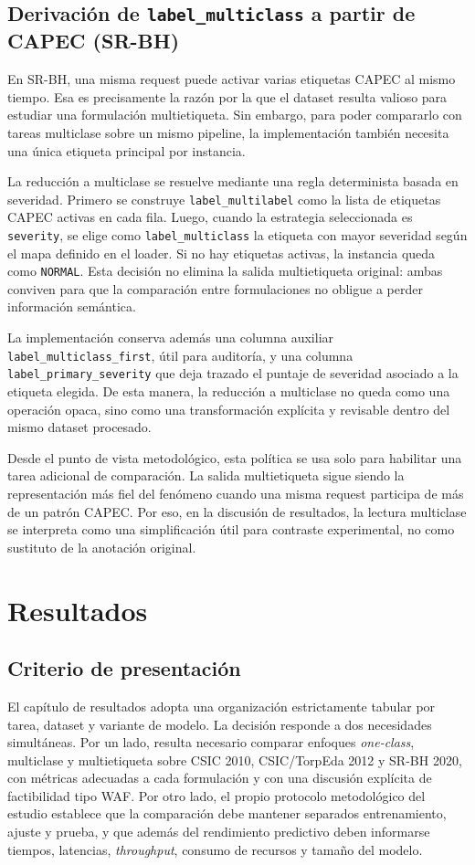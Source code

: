 \documentclass[12pt,oneside]{report}
\begin{document}

\section{Derivación de \texttt{label\_multiclass} a partir de CAPEC (SR-BH)}
En SR-BH, una misma request puede activar varias etiquetas CAPEC al mismo tiempo. Esa es precisamente la razón por la que el dataset resulta valioso para estudiar una formulación multietiqueta. Sin embargo, para poder compararlo con tareas multiclase sobre un mismo pipeline, la implementación también necesita una única etiqueta principal por instancia.

La reducción a multiclase se resuelve mediante una regla determinista basada en severidad. Primero se construye \texttt{label\_multilabel} como la lista de etiquetas CAPEC activas en cada fila. Luego, cuando la estrategia seleccionada es \texttt{severity}, se elige como \texttt{label\_multiclass} la etiqueta con mayor severidad según el mapa definido en el loader. Si no hay etiquetas activas, la instancia queda como \texttt{NORMAL}. Esta decisión no elimina la salida multietiqueta original: ambas conviven para que la comparación entre formulaciones no obligue a perder información semántica.

La implementación conserva además una columna auxiliar \texttt{label\_multiclass\_first}, útil para auditoría, y una columna \texttt{label\_primary\_severity} que deja trazado el puntaje de severidad asociado a la etiqueta elegida. De esta manera, la reducción a multiclase no queda como una operación opaca, sino como una transformación explícita y revisable dentro del mismo dataset procesado.

Desde el punto de vista metodológico, esta política se usa solo para habilitar una tarea adicional de comparación. La salida multietiqueta sigue siendo la representación más fiel del fenómeno cuando una misma request participa de más de un patrón CAPEC. Por eso, en la discusión de resultados, la lectura multiclase se interpreta como una simplificación útil para contraste experimental, no como sustituto de la anotación original.


\chapter{Resultados}

\section{Criterio de presentación}
El capítulo de resultados adopta una organización estrictamente tabular por tarea, dataset y variante de modelo. La decisión responde a dos necesidades simultáneas. Por un lado, resulta necesario comparar enfoques \textit{one-class}, multiclase y multietiqueta sobre CSIC 2010, CSIC/TorpEda 2012 y SR-BH 2020, con métricas adecuadas a cada formulación y con una discusión explícita de factibilidad tipo WAF. Por otro lado, el propio protocolo metodológico del estudio establece que la comparación debe mantener separados entrenamiento, ajuste y prueba, y que además del rendimiento predictivo deben informarse tiempos, latencias, \textit{throughput}, consumo de recursos y tamaño del modelo.\
\end{document}
